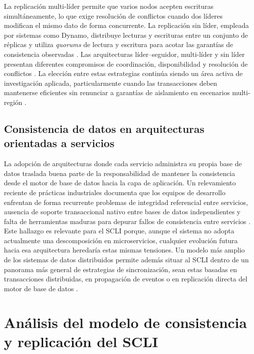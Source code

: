 \documentclass[conference]{IEEEtran}
\begin{document}
La replicaci\'on multi-l\'ider permite que varios nodos acepten escrituras simult\'aneamente, lo que exige resoluci\'on de conflictos cuando dos l\'ideres modifican el mismo dato de forma concurrente. La replicaci\'on sin l\'ider, empleada por sistemas como Dynamo, distribuye lecturas y escrituras entre un conjunto de r\'eplicas y utiliza \emph{quorums} de lectura y escritura para acotar las garant\'ias de consistencia observadas \cite{decandia2007}. Las arquitecturas l\'ider--seguidor, multi-l\'ider y sin l\'ider presentan diferentes compromisos de coordinaci\'on, disponibilidad y resoluci\'on de conflictos \cite{vansteen2017}. La elecci\'on entre estas estrategias contin\'ua siendo un \'area activa de investigaci\'on aplicada, particularmente cuando las transacciones deben mantenerse eficientes sin renunciar a garant\'ias de aislamiento en escenarios multi-regi\'on \cite{nguyen2023}.

\subsection{Consistencia de datos en arquitecturas orientadas a servicios}

La adopci\'on de arquitecturas donde cada servicio administra su propia base de datos traslada buena parte de la responsabilidad de mantener la consistencia desde el motor de base de datos hacia la capa de aplicaci\'on. Un relevamiento reciente de pr\'acticas industriales documenta que los equipos de desarrollo enfrentan de forma recurrente problemas de integridad referencial entre servicios, ausencia de soporte transaccional nativo entre bases de datos independientes y falta de herramientas maduras para depurar fallos de consistencia entre servicios \cite{laigner2021}. Este hallazgo es relevante para el SCLI porque, aunque el sistema no adopta actualmente una descomposici\'on en microservicios, cualquier evoluci\'on futura hacia esa arquitectura heredar\'ia estas mismas tensiones. Un modelo m\'as amplio de los sistemas de datos distribuidos permite adem\'as situar al SCLI dentro de un panorama m\'as general de estrategias de sincronizaci\'on, sean estas basadas en transacciones distribuidas, en propagaci\'on de eventos o en replicaci\'on directa del motor de base de datos \cite{margara2023}.

\section{An\'alisis del modelo de consistencia y replicaci\'on del SCLI}
\end{document}
